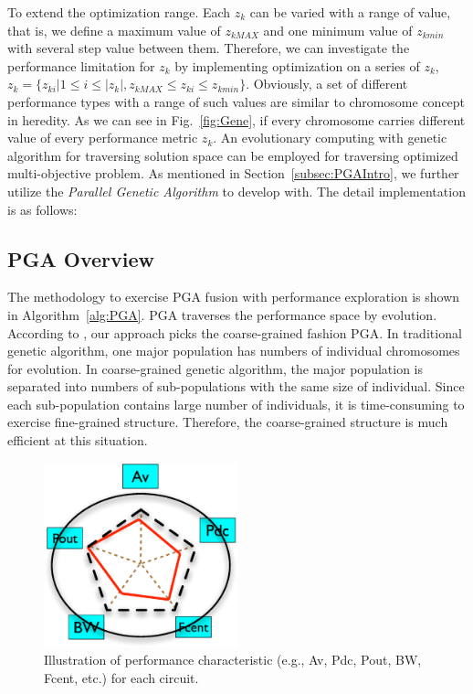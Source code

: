     To extend the optimization range. Each $z_k$ can be varied with a range of value, that is, we define a maximum value of $z_{kMAX}$ and one minimum value of $z_{kmin}$ with several step value between them. Therefore, we can investigate the performance limitation for $z_k$ by implementing optimization on a series of $z_k$, $z_k=\{z_{ki}| 1 \leq i \leq |z_k|, z_{kMAX} \leq z_{ki} \leq z_{kmin} \}$. Obviously, a set of different performance types with a range of such values are similar to chromosome concept in heredity. As we can see in Fig.~\ref{fig:Gene}, if every chromosome carries different value of every performance metric $z_k$. An evolutionary computing with genetic algorithm for traversing solution space can be employed for traversing optimized multi-objective problem. As mentioned in Section~\ref{subsec:PGAIntro}, we further utilize the {\it Parallel Genetic Algorithm} to develop with. The detail implementation is as follows:

    


    \subsection{PGA Overview}

      The methodology to exercise PGA fusion with performance exploration is shown in Algorithm~\ref{alg:PGA}. PGA traverses the performance space by evolution. According to \cite{SurveyDistPGA1997}, our approach picks the coarse-grained fashion PGA. In traditional genetic algorithm, one major population has numbers of individual chromosomes for evolution. In coarse-grained genetic algorithm, the major population is separated into numbers of sub-populations with the same size of individual. Since each sub-population contains large number of individuals, it is time-consuming to exercise fine-grained structure. Therefore, the coarse-grained structure is much efficient at this situation. 


      \begin{figure}[t]
        \centering
        \includegraphics[width=0.5\textwidth]{Fig/Chapter2/MultiSpec.eps}
        \caption{Illustration of performance characteristic (e.g., Av, Pdc, Pout, BW, Fcent, etc.) for each circuit.} 
        \label{fig:MultiSpec}
      \end{figure}


